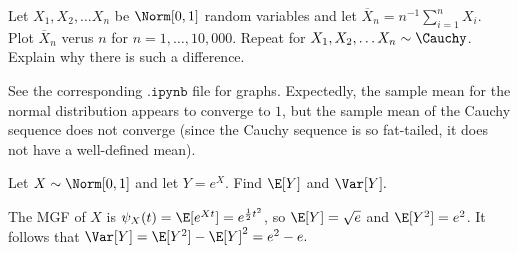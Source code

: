 \documentclass[a4paper]{article}
\begin{document}
\begin{Exercise}
	Let $X_1, X_2, \ldots X_n$ be $\Norm[0, 1]$ random variables and let $\overline{X}_n = n^{-1} \sum_{i = 1}^{n} X_i$. Plot $\overline{X}_n$ verus $n$ for $n = 1, \ldots , 10,000$. Repeat for $X_1, X_2, \ldots X_n \sim \Cauchy$. Explain why there is such a difference.
\end{Exercise}
\begin{Solution}
	See the corresponding $\texttt{.ipynb}$ file for graphs. Expectedly, the sample mean for the normal distribution appears to converge to $1$, but the sample mean of the Cauchy sequence does not converge (since the Cauchy sequence is so fat-tailed, it does not have a well-defined mean).
\end{Solution}
\begin{Exercise}
	Let $X \sim \Norm[0, 1]$ and let $Y = e^{X}$. Find $\E[Y]$ and $\Var[Y].$ 
\end{Exercise}
\begin{Solution}
	The MGF of $X$ is $\psi_X(t) = \E[e^{Xt}] = e^{\frac{1}{2}t^2}$, so 
	$\E[Y] = \sqrt{e}$ and $\E[Y^2] = e^2$. It follows that $\Var[Y] = \E[Y^2] - \E[Y]^2 = e^2 - e.$
\end{Solution}
\end{document}
